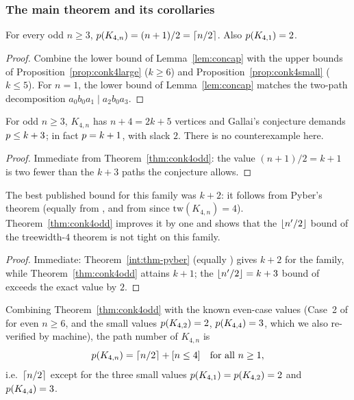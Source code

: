\subsubsection{The main theorem and its corollaries}

\begin{theorem}\label{thm:conk4odd}
For every odd $n\ge3$, $p(K_{4,n})=(n+1)/2=\left\lceil n/2 \right\rceil$. Also
$p(K_{4,1})=2$.
\end{theorem}

\begin{proof}
Combine the lower bound of Lemma~\ref{lem:concap} with the upper bounds of
Proposition~\ref{prop:conk4large} ($k\ge6$) and
Proposition~\ref{prop:conk4small} ($k\le5$). For $n=1$, the lower bound of
Lemma~\ref{lem:concap} matches the two-path decomposition
$a_0b_0a_1 \mid a_2b_0a_3$.
\end{proof}

\begin{corollary}\label{cor:conk4gallai}
For odd $n\ge3$, $K_{4,n}$ has $n+4=2k+5$ vertices and Gallai's conjecture
demands $p\le k+3$; in fact $p=k+1$, with slack $2$. There is no
counterexample here.
\end{corollary}

\begin{proof}
Immediate from Theorem~\ref{thm:conk4odd}: the value $(n+1)/2=k+1$ is two
fewer than the $k+3$ paths the conjecture allows.
\end{proof}

\begin{corollary}\label{cor:conk4compare}
The best published bound for this family was $k+2$: it follows from
Pyber's theorem \cite{Pyb96} (equally from \cite{Fan05}, and from
\cite{LY24} since $\mathrm{tw}(K_{4,n})=4$). Theorem~\ref{thm:conk4odd}
improves it by one and shows that the $\left\lfloor n'/2 \right\rfloor$ bound of the
treewidth-$4$ theorem \cite{LY24} is not tight on this family.
\end{corollary}

\begin{proof}
Immediate: Theorem~\ref{int:thm-pyber} (equally \cite{Fan05,LY24}) gives $k+2$
for the family, while Theorem~\ref{thm:conk4odd} attains $k+1$; the
$\left\lfloor n'/2 \right\rfloor=k+3$ bound of \cite{LY24} exceeds the exact value by $2$.
\end{proof}

\begin{remark}\label{rem:conk4all}
Combining Theorem~\ref{thm:conk4odd} with the known even-case values
(Case~2 of \cite{CE18} for even $n\ge6$, and the small values
$p(K_{4,2})=2$, $p(K_{4,4})=3$, which we also re-verified by machine),
the path number of $K_{4,n}$ is
\[
p(K_{4,n})=\left\lceil n/2 \right\rceil+[n\le 4]\quad\text{for all } n\ge1,
\]
i.e.\ $\left\lceil n/2 \right\rceil$ except for the three small values
$p(K_{4,1})=p(K_{4,2})=2$ and $p(K_{4,4})=3$.
\end{remark}

